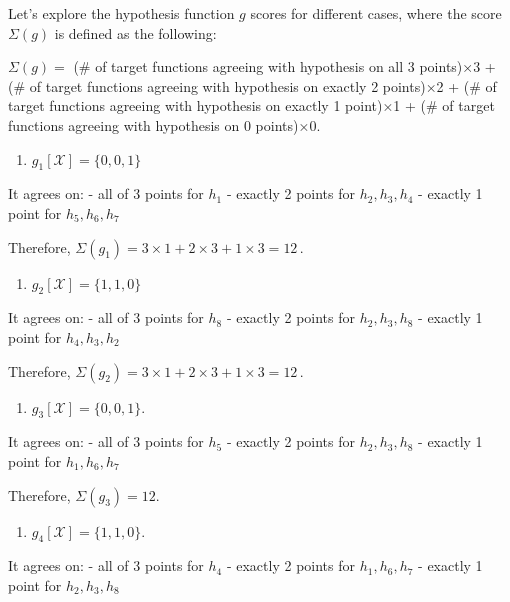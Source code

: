 \documentclass[11pt]{article}
\providecommand{\tightlist}{%
      \setlength{\itemsep}{0pt}\setlength{\parskip}{0pt}}
\begin{document}
Let's explore the hypothesis function \(g\) scores for different cases,
where the score \(\Sigma(g)\) is defined as the following:

\(\Sigma(g)=\) (\# of target functions agreeing with hypothesis on all 3
points)×3 + (\# of target functions agreeing with hypothesis on exactly
2 points)×2 + (\# of target functions agreeing with hypothesis on
exactly 1 point)×1 + (\# of target functions agreeing with hypothesis on
0 points)×0.

\begin{enumerate}
\def\labelenumi{(\alph{enumi})}
\tightlist
\item
  \(g_1[\mathcal{X}]=\{ 0,0,1\}\)
\end{enumerate}

It agrees on: - all of 3 points for \(h_1\) - exactly 2 points for
\(h_2,h_3,h_4\) - exactly 1 point for \(h_5,h_6,h_7\)

Therefore, \(\Sigma(g_1)= 3 \times 1 + 2 \times 3 + 1 \times 3 = 12\,.\)

\begin{enumerate}
\def\labelenumi{(\alph{enumi})}
\setcounter{enumi}{1}
\tightlist
\item
  \(g_2[\mathcal{X}]=\{ 1,1,0\}\)
\end{enumerate}

It agrees on: - all of 3 points for \(h_8\) - exactly 2 points for
\(h_2,h_3,h_8\) - exactly 1 point for \(h_4,h_3,h_2\)

Therefore, \(\Sigma(g_2)= 3 \times 1 + 2 \times 3 + 1 \times 3 = 12\,.\)

\begin{enumerate}
\def\labelenumi{(\alph{enumi})}
\setcounter{enumi}{2}
\tightlist
\item
  \(g_3[\mathcal{X}]=\{ 0,0,1\}\).
\end{enumerate}

It agrees on: - all of 3 points for \(h_5\) - exactly 2 points for
\(h_2,h_3,h_8\) - exactly 1 point for \(h_1,h_6,h_7\)

Therefore, \(\Sigma(g_3)= 12\).

\begin{enumerate}
\def\labelenumi{(\alph{enumi})}
\setcounter{enumi}{3}
\tightlist
\item
  \(g_4[\mathcal{X}]=\{ 1,1,0\}\).
\end{enumerate}

It agrees on: - all of 3 points for \(h_4\) - exactly 2 points for
\(h_1,h_6,h_7\) - exactly 1 point for \(h_2,h_3,h_8\)
\end{document}
